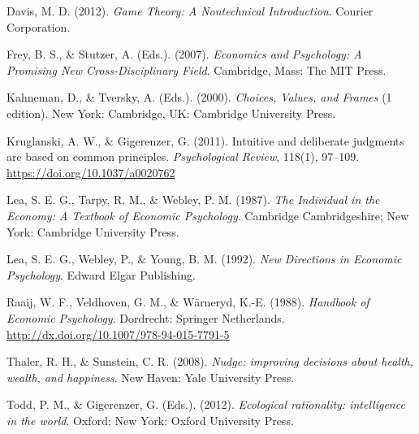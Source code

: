 \documentclass[
  x11names]{article}
\begin{document}
Davis, M. D. (2012). \emph{Game Theory: A Nontechnical Introduction}.
Courier Corporation.

Frey, B. S., \& Stutzer, A. (Eds.). (2007). \emph{Economics and
Psychology: A Promising New Cross-Disciplinary Field}. Cambridge, Mass:
The MIT Press.

Kahneman, D., \& Tversky, A. (Eds.). (2000). \emph{Choices, Values, and
Frames} (1 edition). New York: Cambridge, UK: Cambridge University
Press.

Kruglanski, A. W., \& Gigerenzer, G. (2011). Intuitive and deliberate
judgments are based on common principles. \emph{Psychological Review},
118(1), 97--109. \color{blue} \url{https://doi.org/10.1037/a0020762}
\color{black}

Lea, S. E. G., Tarpy, R. M., \& Webley, P. M. (1987). \emph{The
Individual in the Economy: A Textbook of Economic Psychology}. Cambridge
Cambridgeshire; New York: Cambridge University Press.

Lea, S. E. G., Webley, P., \& Young, B. M. (1992). \emph{New Directions
in Economic Psychology}. Edward Elgar Publishing.

Raaij, W. F., Veldhoven, G. M., \& Wärneryd, K.-E. (1988).
\emph{Handbook of Economic Psychology}. Dordrecht: Springer Netherlands.
\color{blue} \url{http://dx.doi.org/10.1007/978-94-015-7791-5}
\color{black}

Thaler, R. H., \& Sunstein, C. R. (2008). \emph{Nudge: improving
decisions about health, wealth, and happiness}. New Haven: Yale
University Press.

Todd, P. M., \& Gigerenzer, G. (Eds.). (2012). \emph{Ecological
rationality: intelligence in the world}. Oxford; New York: Oxford
University Press.
\end{document}
